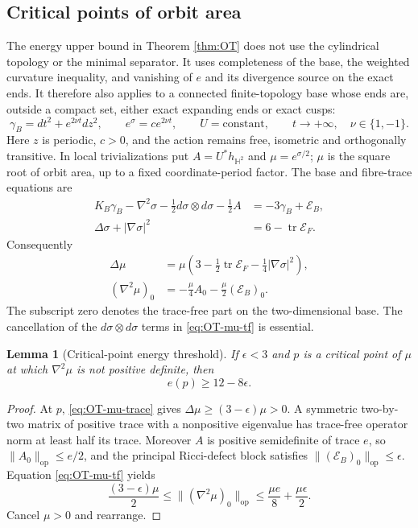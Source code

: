\documentclass[a4paper,11pt]{article}
\numberwithin{equation}{section}
\newtheorem{lemma}[theorem]{Lemma}
\theoremstyle{definition}
\newcommand{\tr}{\operatorname{tr}}
\newcommand{\op}{\mathrm{op}}
\begin{document}
\subsection{Critical points of orbit area}\label{sec:OT-critical}
The energy upper bound in Theorem \ref{thm:OT} does not use the cylindrical topology or the minimal separator. It uses completeness of the base, the weighted curvature inequality, and vanishing of $e$ and its divergence source on the exact ends. It therefore also applies to a connected finite-topology base whose ends are, outside a compact set, either exact expanding ends or exact cusps:
\[
 \gamma_B=dt^2+e^{2\nu t}dz^2,\qquad
 e^\sigma=c e^{2\nu t},\qquad U=\text{constant},
 \qquad t\longrightarrow+\infty,\quad \nu\in\{1,-1\}.
\]
Here $z$ is periodic, $c>0$, and the action remains free, isometric and orthogonally transitive. In local trivializations put $A=U^*h_{\mathbb H^2}$ and $\mu=e^{\sigma/2}$; $\mu$ is the square root of orbit area, up to a fixed coordinate-period factor. The base and fibre-trace equations are
\begin{align}
 K_B\gamma_B-\nabla^2\sigma-\tfrac12d\sigma\otimes d\sigma-\tfrac12A
   &=-3\gamma_B+\mathcal E_B,\label{eq:OT-base-critical}\\
 \Delta\sigma+|\nabla\sigma|^2&=6-\tr\mathcal E_F.
\end{align}
Consequently
\begin{align}
 \Delta\mu&=\mu\left(3-\tfrac12\tr\mathcal E_F-\tfrac14|\nabla\sigma|^2\right),\label{eq:OT-mu-trace}\\
 (\nabla^2\mu)_0&=-\tfrac\mu4A_0-\tfrac\mu2(\mathcal E_B)_0.\label{eq:OT-mu-tf}
\end{align}
The subscript zero denotes the trace-free part on the two-dimensional base. The cancellation of the $d\sigma\otimes d\sigma$ terms in \eqref{eq:OT-mu-tf} is essential.

\begin{lemma}[Critical-point energy threshold]\label{lem:OT-critical}
If $\epsilon<3$ and $p$ is a critical point of $\mu$ at which $\nabla^2\mu$ is not positive definite, then
\[
 e(p)\ge12-8\epsilon.
\]
\end{lemma}
\begin{proof}
At $p$, \eqref{eq:OT-mu-trace} gives $\Delta\mu\ge(3-\epsilon)\mu>0$. A symmetric two-by-two matrix of positive trace with a nonpositive eigenvalue has trace-free operator norm at least half its trace. Moreover $A$ is positive semidefinite of trace $e$, so $\|A_0\|_{\op}\le e/2$, and the principal Ricci-defect block satisfies $\|(\mathcal E_B)_0\|_{\op}\le\epsilon$. Equation \eqref{eq:OT-mu-tf} yields
\[
 \frac{(3-\epsilon)\mu}{2}
 \le\|(\nabla^2\mu)_0\|_{\op}
 \le\frac{\mu e}{8}+\frac{\mu\epsilon}{2}.
\]
Cancel $\mu>0$ and rearrange.
\end{proof}
\end{document}
